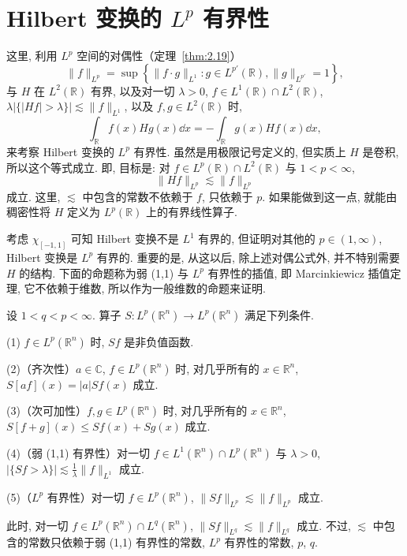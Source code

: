 
\section{\texorpdfstring{Hilbert 变换的 $L^{p}$ 有界性}{Hilbert 变换的 Lp 有界性}}\label{sec:4.4}

这里, 利用 $L^{p}$ 空间的对偶性（定理~\ref{thm:2.19}）
\[
\|f\|_{L^{p}} = \sup\left\{\|f \cdot g\|_{L^{1}} : g \in L^{p'}(\mathbb{R}), \|g\|_{L^{p'}} = 1\right\},
\]
与 $H$ 在 $L^{2}(\mathbb{R})$ 有界, 以及对一切 $\lambda > 0$, $f \in L^{1}(\mathbb{R}) \cap L^{2}(\mathbb{R})$, $\lambda|\{|Hf| > \lambda\}| \lesssim \|f\|_{L^{1}}$, 以及 $f, g \in L^{2}(\mathbb{R})$ 时,
\[
\int_{\mathbb{R}}f(x)Hg(x)\dd x = -\int_{\mathbb{R}}g(x)Hf(x)\dd x,
\]
来考察 Hilbert 变换的 $L^{p}$ 有界性. 虽然是用极限记号定义的, 但实质上 $H$ 是卷积, 所以这个等式成立. 即, 目标是: 对 $f \in L^{p}(\mathbb{R}) \cap L^{2}(\mathbb{R})$ 与 $1 < p < \infty$,
\[
\|Hf\|_{L^{p}} \lesssim \|f\|_{L^{p}}
\]
成立. 这里, $\lesssim$ 中包含的常数不依赖于 $f$, 只依赖于 $p$. 如果能做到这一点, 就能由稠密性将 $H$ 定义为 $L^{p}(\mathbb{R})$ 上的有界线性算子.

考虑 $\chi_{[-1,1]}$ 可知 Hilbert 变换不是 $L^{1}$ 有界的, 但证明对其他的 $p \in (1, \infty)$, Hilbert 变换是 $L^{p}$ 有界的. 重要的是, 从这以后, 除上述对偶公式外, 并不特别需要 $H$ 的结构. 下面的命题称为弱 (1,1) 与 $L^{p}$ 有界性的插值, 即 Marcinkiewicz 插值定理, 它不依赖于维数, 所以作为一般维数的命题来证明.

\begin{theorem}\label{thm:4.5}
设 $1 < q < p < \infty$. 算子 $S: L^{p}(\mathbb{R}^{n}) \to L^{p}(\mathbb{R}^{n})$ 满足下列条件.

(1) $f \in L^{p}(\mathbb{R}^{n})$ 时, $Sf$ 是非负值函数.

(2)（齐次性）$a \in \mathbb{C}$, $f \in L^{p}(\mathbb{R}^{n})$ 时, 对几乎所有的 $x \in \mathbb{R}^{n}$, $S[af](x) = |a|Sf(x)$ 成立.

(3)（次可加性）$f, g \in L^{p}(\mathbb{R}^{n})$ 时, 对几乎所有的 $x \in \mathbb{R}^{n}$, $S[f+g](x) \leq Sf(x) + Sg(x)$ 成立.

(4)（弱 (1,1) 有界性）对一切 $f \in L^{1}(\mathbb{R}^{n}) \cap L^{p}(\mathbb{R}^{n})$ 与 $\lambda > 0$, $|\{Sf > \lambda\}| \lesssim \frac{1}{\lambda}\|f\|_{L^{1}}$ 成立.

(5)（$L^{p}$ 有界性）对一切 $f \in L^{p}(\mathbb{R}^{n})$, $\|Sf\|_{L^{p}} \lesssim \|f\|_{L^{p}}$ 成立.

此时, 对一切 $f \in L^{p}(\mathbb{R}^{n}) \cap L^{q}(\mathbb{R}^{n})$, $\|Sf\|_{L^{q}} \lesssim \|f\|_{L^{q}}$ 成立. 不过, $\lesssim$ 中包含的常数只依赖于弱 (1,1) 有界性的常数, $L^{p}$ 有界性的常数, $p$, $q$.
\end{theorem}

